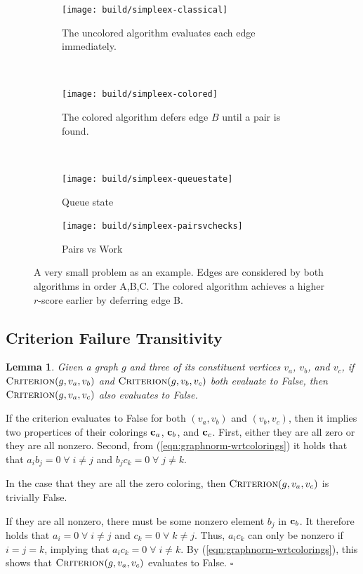 \documentclass{report}
\newtheorem{lemma}{Lemma}
\newenvironment{proof}[1][Proof]{\begin{trivlist}
   \item[\hskip \labelsep {\bfseries #1}]}{\hfill$\square$\end{trivlist}}
\begin{document}
\begin{figure}[t]
\begin{subfigure}[b]{\linewidth}
\centering
\texttt{[image: build/simpleex-classical]}
\caption{The uncolored algorithm evaluates each edge immediately.}
\end{subfigure}
\vspace{0.00001in}\\
\begin{subfigure}[b]{\linewidth}
\centering
\texttt{[image: build/simpleex-colored]}
\caption{The colored algorithm defers edge $B$ until a pair is found.}
\end{subfigure}
\vspace{0.00001in}\\
\begin{subfigure}[b]{0.49\linewidth}
\centering
\texttt{[image: build/simpleex-queuestate]}
\caption{Queue state}
\label{subfig:results}
\end{subfigure}
\begin{subfigure}[b]{0.49\linewidth}
\centering
\texttt{[image: build/simpleex-pairsvchecks]}
\caption{Pairs vs Work}
\end{subfigure}
\caption{A very small problem as an example.
   Edges are considered by both algorithms in order A,B,C.
   The colored algorithm achieves a higher $r$-score earlier
   by deferring edge B.}
\label{fig:simple-example}
\end{figure}

\subsection{Criterion Failure Transitivity}

\begin{lemma}
Given a graph $g$ and three of its constituent vertices
$v_a$, $v_b$, and $v_c$,
if $\textsc{Criterion}(g, v_a, v_b)$
and $\textsc{Criterion}(g, v_b, v_c)$ both evaluate to False,
then $\textsc{Criterion}(g, v_a, v_c)$ also evaluates to False.
\label{lem:failure-transitivity}
\end{lemma}

\begin{proof}
If the criterion evaluates to False for both
$(v_a,v_b)$ and $(v_b,v_c)$,
then it implies two propertices of their colorings
${\bf c}_a$, ${\bf c}_b$, and ${\bf c}_c$.
First, either they are all zero or they are all nonzero.
Second, from (\ref{eqn:graphnorm-wrtcolorings}) it holds that
that $a_i b_j = 0 \;\forall\; i \neq j$
and $b_j c_k = 0 \;\forall\; j \neq k$.

In the case that they are all the zero coloring,
then $\textsc{Criterion}(g, v_a, v_c)$ is trivially False.

If they are all nonzero,
there must be some nonzero element $b_j$ in ${\bf c}_b$.
It therefore holds that
$a_i = 0 \;\forall\; i \neq j$
and $c_k = 0 \;\forall\; k \neq j$.
Thus, $a_i c_k$ can only be nonzero if $i=j=k$,
implying that $a_i c_k = 0 \;\forall\; i \neq k$.
By (\ref{eqn:graphnorm-wrtcolorings}),
this shows that $\textsc{Criterion}(g, v_a, v_c)$
evaluates to False.
\end{proof}
\end{document}

